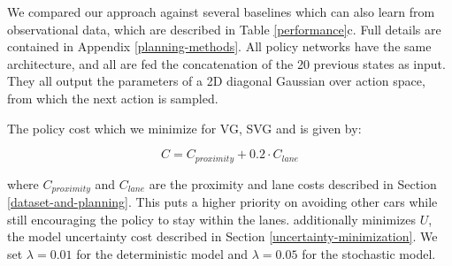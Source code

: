 \documentclass{article} %
\begin{document}
    We compared our approach against several baselines which can also learn from observational data, which are described in Table \ref{performance}c. Full details are contained in Appendix \ref{planning-methods}.
    All policy networks have the same architecture, and all are fed the concatenation of the 20 previous states as input. They all output the parameters of a 2D diagonal Gaussian over action space, from which the next action is sampled.
    





    The policy cost which we minimize for VG, SVG and \modelnamedrop is given by:

    \begin{equation}
      C = C_{proximity} + 0.2 \cdot C_{lane}
    \end{equation}

    where $C_{proximity}$ and $C_{lane}$ are the proximity and lane costs described in Section \ref{dataset-and-planning}. This puts a higher priority on avoiding other cars while still encouraging the policy to stay within the lanes. \modelnamedrop additionally minimizes $U$, the model uncertainty cost described in Section \ref{uncertainty-minimization}. We set $\lambda=0.01$ for the deterministic model and $\lambda=0.05$ for the stochastic model. 
\end{document}
